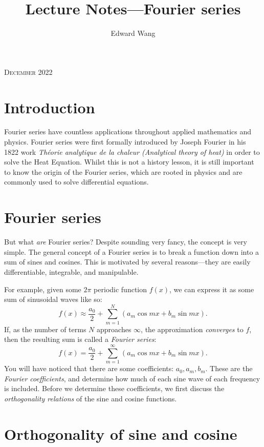 \documentclass{amsart}
\title{Lecture Notes---Fourier series}
\author{Edward Wang}
\begin{document}
  \maketitle
  \begin{center}
    \scshape December 2022 \vspace{1em}
  \end{center}
  \tableofcontents
  
  \section{Introduction}

  Fourier series have countless applications throughout applied mathematics and physics. Fourier series were first formally introduced by Joseph Fourier in his 1822 work \emph{Théorie analytique de la chaleur (Analytical theory of heat)} in order to solve the Heat Equation. Whilst this is not a history lesson, it is still important to know the origin of the Fourier series, which are rooted in physics and are commonly used to solve differential equations.

  \section{Fourier series}

  But what \emph{are} Fourier series? Despite sounding very fancy, the concept is very simple. The general concept of a Fourier series is to break a function down into a sum of sines and cosines. This is motivated by several reasons---they are easily differentiable, integrable, and manipulable.

  For example, given some $2\pi$ periodic function $f(x)$, we can express it as some sum of sinusoidal waves like so:
  \[
    f(x) \approx \frac{a_0}{2} + \sum_{m=1}^{N} (a_m \cos mx + b_m \sin mx)
  .\] If, as the number of terms $N$ approaches $\infty$, the approximation \emph{converges} to $f$, then the resulting sum is called a \emph{Fourier series}:
  \[
    f(x) = \frac{a_0}{2} + \sum_{m=1}^{\infty} (a_m \cos mx + b_m \sin mx)
  .\] You will have noticed that there are some coefficients: $a_0, a_m, b_m$. These are the \emph{Fourier coefficients}, and determine how much of each sine wave of each frequency is included. Before we determine these coefficients, we first discuss the \emph{orthogonality relations} of the sine and cosine functions.

  \section{Orthogonality of sine and cosine}
\end{document}
